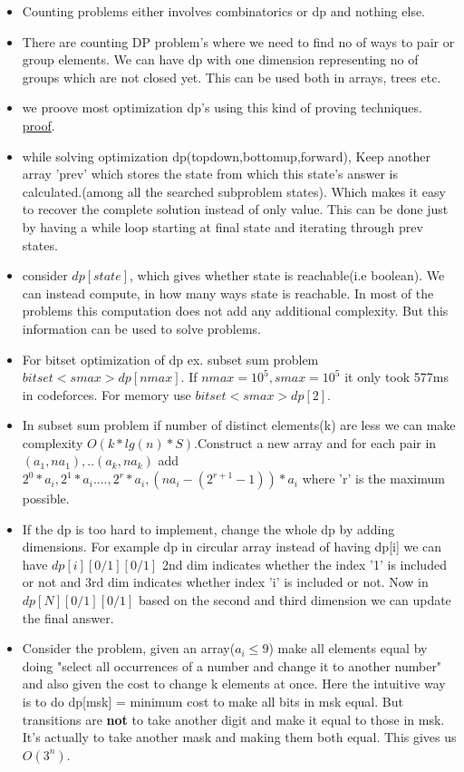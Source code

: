\documentclass[../Notes.tex]{subfiles}
\begin{document}
\begin{itemize}
	\item Counting problems either involves combinatorics or dp and nothing else.
	\item There are counting DP problem's where we need to find no of ways to pair or group elements. We can have dp with one dimension representing no of groups which are not closed yet. This can be used both in arrays, trees etc.  
	\item we proove most optimization dp's using this kind of proving techniques.
	\href{Material/dpproof.pdf}{proof}.\pagebreak
	\item while solving optimization dp(topdown,bottomup,forward), Keep another array 'prev' which stores the state from which this state's answer is calculated.(among all the searched subproblem states). Which makes it easy to recover the complete solution instead of only value. This can be done just by having a while loop starting at final state and iterating through prev states.
	\item consider $dp[state]$, which gives whether state is reachable(i.e boolean). We can instead compute, in how many ways state is reachable. In most of the problems this computation does not add any additional complexity. But this information can be used to solve problems.   
	\item For bitset optimization of dp ex. subset sum problem $bitset<smax> dp[nmax]$. If $nmax = 10^5, smax = 10^5$ it only took 577ms in codeforces. For memory use $bitset<smax> dp[2]$. 
	\item In subset sum problem if number of distinct elements(k) are less we can make complexity $O(k*lg(n)*S)$.Construct a new array and for each pair in $(a_1,na_1),..(a_k,na_k)$ add $2^0*a_i, 2^1*a_i...., 2^r*a_i, (na_i-(2^{r+1}-1))*a_i$ where 'r' is the maximum possible.
	\item If the dp is too hard to implement, change the whole dp by adding dimensions. For example dp in circular array instead of having dp[i] we can have $dp[i][0/1][0/1]$ 2nd dim indicates whether the index '1' is included or not and 3rd dim indicates whether index 'i' is included or not. Now in $dp[N][0/1][0/1]$ based on the second and third dimension we can update the final answer.
	\item Consider the problem, given an array($a_i\leq9$) make all elements equal by doing "select all occurrences of a number and change it to another number" and also given the cost to change k elements at once. Here the intuitive way is to do dp[msk] = minimum cost to make all bits in msk equal. But transitions are \textbf{not} to take another digit and make it equal to those in msk. It's actually to take another mask and making them both equal. This gives us $O(3^n)$.
\end{itemize}
\end{document}
